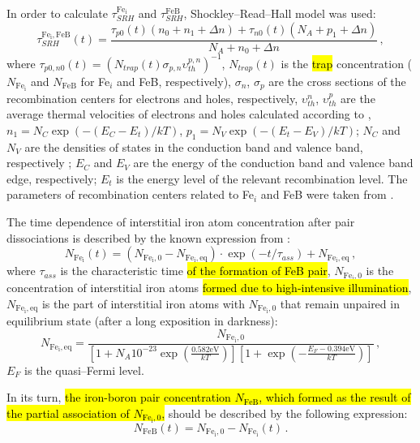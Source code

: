 \documentclass[sn-mathphys]{sn-jnl}%
\theoremstyle{thmstyleone}%
\theoremstyle{thmstyletwo}%
\theoremstyle{thmstylethree}%
\begin{document}
In order to calculate $\tau_{SRH}^{\mathrm{Fe_i}}$  and $\tau_{SRH}^\mathrm{FeB}$,
Shockley--Read--Hall model was used:
\begin{equation}
\label{eqTauSRH}
\tau_{SRH}^{\mathrm{Fe_i,FeB}}(t)=\frac{\tau_{p0}(t)(n_0+n_1+\Delta n)+\tau_{n0}(t)(N_A+p_1+\Delta n)}
                             {N_A+n_0+\Delta n}\,,
\end{equation}
where
$\tau_{p0,n0}(t)=(N_{trap}(t) \sigma_{p,n}\upsilon_{th}^{p,n})^{-1}$,
$N_{trap}(t)$ is the \hl{trap} concentration
($N_\mathrm{Fe_i}$ and $N_\mathrm{FeB}$ for Fe$_i$ and FeB, respectively),
$\sigma_n$, $\sigma_p$  are the cross sections of the recombination centers for electrons and holes, respectively,
$\upsilon_{th}^{n}$, $\upsilon_{th}^{p}$ are the average thermal velocities of electrons and holes calculated according to \cite{Nc:Green},
$n_1=N_C \exp(-(E_C-E_t)/kT)$,
$p_1=N_V \exp(-(E_t-E_V)/kT)$;
$N_C$ and $N_V$ are the densities of
states in the conduction band and valence band, respectively \cite{Si_ni_Couderc};
$E_C$ and $E_V$ are the energy of the conduction band and
valence band edge, respectively;
$E_t$ is the energy level of the relevant recombination level.
The parameters of recombination centers related to Fe$_i$ and FeB were taken from \cite{ROUGIEUX2018}.

The time dependence of interstitial iron atom concentration
after pair dissociations is described by the known expression from \cite{MurphyJAP2011}:
\begin{equation}
\label{eqNFet}
N_\mathrm{Fe_i}(t)=(N_\mathrm{Fe_i,0}-N_\mathrm{Fe_i,eq})\cdot
\exp(-t/\tau_{ass})+N_\mathrm{Fe_i,eq}\,,
\end{equation}
where
$\tau_{ass}$ is the characteristic time \hl{of the formation of FeB pair},
$N_\mathrm{Fe_i,0}$ is the concentration of interstitial iron atoms
\hl{formed due to high-intensive illumination},
$N_\mathrm{Fe_i,eq}$ is the part of interstitial iron atoms with $N_\mathrm{Fe_i,0}$
that remain unpaired in equilibrium state (after a long exposition in darkness)\cite{FeB:kinetic}:
\begin{equation}
\label{eqNFeeq}
N_\mathrm{Fe_i,eq}=\frac{N_\mathrm{Fe_i,0}}
   {\left[1+N_A 10^{-23}\exp\left(\frac{0.582\mathrm{eV}}{kT}\right)\right]
    \left[1+\exp\left(-\frac{E_F-0.394\mathrm{eV}}{kT}\right)\right]}\,,
\end{equation}
$E_F$ is the quasi--Fermi level.

In its turn, \hl{ the iron-boron pair concentration $N_\mathrm{FeB}$, which
formed as the result of the partial association of $N_\mathrm{Fe_i,0}$, }
should be described by the following expression:
\begin{equation}
\label{eqNFeBt}
N_\mathrm{FeB}(t)=N_\mathrm{Fe_i,0}-N_\mathrm{Fe_i}(t)\,.
\end{equation}
\end{document}
